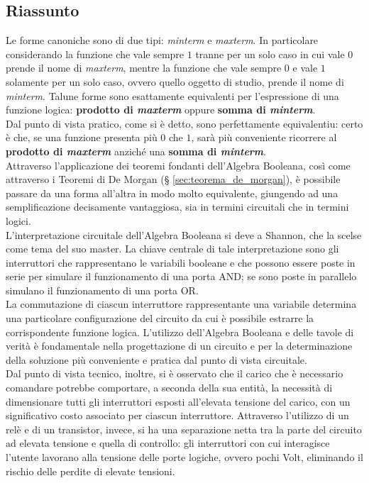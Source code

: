 \documentclass[a4paper]{extarticle}
\begin{document}
\subsection{Riassunto}
Le forme canoniche sono di due tipi: \textit{minterm} e \textit{maxterm}. In particolare considerando la funzione che vale sempre \(1\) tranne per un solo caso in cui vale \(0\) prende il nome di \textit{maxterm}, mentre la funzione che vale sempre \(0\) e vale \(1\) solamente per un solo caso, ovvero quello oggetto di studio, prende il nome di \textit{minterm}. Talune forme sono esattamente equivalenti per l'espressione di una funzione logica: \textbf{prodotto di \textit{maxterm}} oppure \textbf{somma di \textit{minterm}}.\\
Dal punto di vista pratico, come si è detto, sono perfettamente equivalentiu: certo è che, se una funzione presenta più \(0\) che \(1\), sarà più conveniente ricorrere al \textbf{prodotto di \textit{maxterm}} anziché una \textbf{somma di \textit{minterm}}.\\
Attraverso l'applicazione dei teoremi fondanti dell'Algebra Booleana, così come attraverso i Teoremi di De Morgan (§ \ref{sec:teorema_de_morgan}), è possibile passare da una forma all'altra in modo molto equivalente, giungendo ad una semplificazione decisamente vantaggiosa, sia in termini circuitali che in termini logici.\\
L'interpretazione circuitale dell'Algebra Booleana si deve a Shannon, che la scelse come tema del suo master. La chiave centrale di tale interpretazione sono gli interruttori che rappresentano le variabili booleane e che possono essere poste in serie per simulare il funzionamento di una porta AND; se sono poste in parallelo simulano il funzionamento di una porta OR.\\
La commutazione di ciascun interruttore rappresentante una variabile determina una particolare configurazione del circuito da cui è possibile estrarre la corrispondente funzione logica. L'utilizzo dell'Algebra Booleana e delle tavole di verità è fondamentale nella progettazione di un circuito e per la determinazione della soluzione più conveniente e pratica dal punto di vista circuitale.\\
Dal punto di vista tecnico, inoltre, si è osservato che il carico che è necessario comandare potrebbe comportare, a seconda della sua entità, la necessità di dimensionare tutti gli interruttori esposti all'elevata tensione del carico, con un significativo costo associato per ciascun interruttore. Attraverso l'utilizzo di un relè e di un transistor, invece, si ha una separazione netta tra la parte del circuito ad elevata tensione e quella di controllo: gli interruttori con cui interagisce l'utente lavorano alla tensione delle porte logiche, ovvero pochi Volt, eliminando il rischio delle perdite di elevate tensioni.\\
\end{document}
